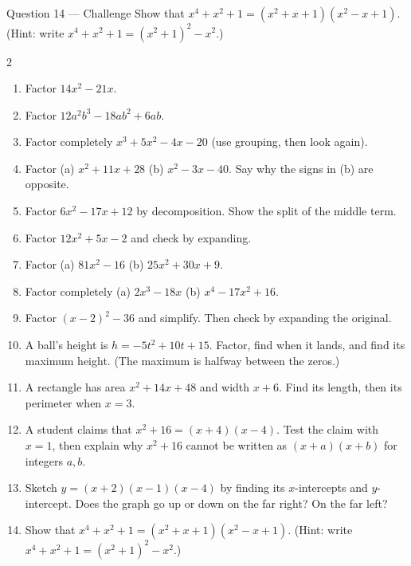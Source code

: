 \documentclass[11pt]{article}
\begin{document}
\begin{qbox}{Question 14 --- Challenge}
Show that $x^4+x^2+1=(x^2+x+1)(x^2-x+1)$. (Hint: write $x^4+x^2+1=(x^2+1)^2-x^2$.)\workspace{3.6cm}
\end{qbox}

\clearpage
{}

\begin{recapbox}
\begin{multicols}{2}
\small
\begin{enumerate}[leftmargin=*,itemsep=3pt]
  \item Factor $14x^2-21x$.
  \item Factor $12a^2b^3-18ab^2+6ab$.
  \item Factor completely $x^3+5x^2-4x-20$ (use grouping, then look again).
  \item Factor (a) $x^2+11x+28$ \quad (b) $x^2-3x-40$. Say why the signs in (b) are opposite.
  \item Factor $6x^2-17x+12$ by decomposition. Show the split of the middle term.
  \item Factor $12x^2+5x-2$ and check by expanding.
  \item Factor (a) $81x^2-16$ \quad (b) $25x^2+30x+9$.
  \item Factor completely (a) $2x^3-18x$ \quad (b) $x^4-17x^2+16$.
  \item Factor $(x-2)^2-36$ and simplify. Then check by expanding the original.
  \item A ball's height is $h=-5t^2+10t+15$. Factor, find when it lands, and find its maximum height. (The maximum is halfway between the zeros.)
  \item A rectangle has area $x^2+14x+48$ and width $x+6$. Find its length, then its perimeter when $x=3$.
  \item A student claims that $x^2+16=(x+4)(x-4)$. Test the claim with $x=1$, then explain why $x^2+16$ cannot be written as $(x+a)(x+b)$ for integers $a,b$.
  \item Sketch $y=(x+2)(x-1)(x-4)$ by finding its $x$-intercepts and $y$-intercept. Does the graph go up or down on the far right? On the far left?
  \item Show that $x^4+x^2+1=(x^2+x+1)(x^2-x+1)$. (Hint: write $x^4+x^2+1=(x^2+1)^2-x^2$.)
\end{enumerate}
\end{multicols}
\end{recapbox}
\end{document}
